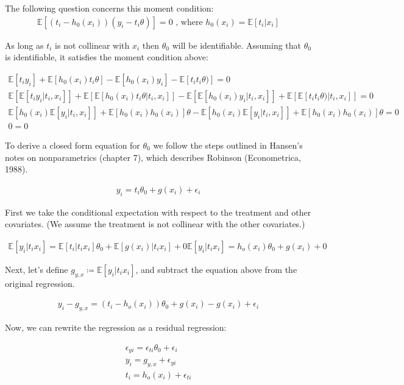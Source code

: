\documentclass[12pt]{article}
\newcommand{\E}{\mathbb{E}}
\begin{document}
The following question concerns this moment condition:
\begin{gather*}
\E[(t_i - h_0(x_i))(y_i - t_i\theta)] = 0 \text{  , where }  h_0(x_i) = \E[t_i | x_i]
\end{gather*}

As long as $t_i$ is not collinear with $x_i$ then $\theta_0$ will be identifiable. Assuming that $\theta_0$ is identifiable, it satisfies the moment condition above:

\begin{gather*}
\E[t_i y_i] + \E[h_0(x_i)t_i\theta] - \E[h_0(x_i)y_i] - \E[t_i t_i\theta)] = 0 \\
\E[\E[t_i y_i |t_i, x_i]] + \E[\E[h_0(x_i)t_i\theta|t_i, x_i]]  - \E[\E[h_0(x_i)y_i |t_i, x_i]]  + \E[\E[t_it_i\theta) |t_i, x_i]]  = 0 \\
\E[h_0(x_i) \E[y_i |t_i, x_i]] + \E[h_0(x_i)h_0(x_i)]\theta  - \E[h_0(x_i) \E[y_i |t_i, x_i]]  + \E[h_0(x_i)h_0(x_i)]\theta   = 0 \\
0=0
\end{gather*}

To derive a closed form equation for $\theta_0$ we follow the steps outlined in Hansen's notes on nonparametrics (chapter 7), which describes Robinson (Econometrica, 1988).

\begin{gather*}
y_i = t_i\theta_0 + g(x_i) + \epsilon_i
\end{gather*}

First we take the conditional expectation with respect to the treatment and other covariates. (We assume the treatment is not collinear with the other covariates.)

\begin{gather*}
\E[y_i|t_i x_i] = \E[t_i|t_i x_i]\theta_0 + \E[g(x_i)|t_i x_i]  + 0
\E[y_i|t_i x_i] = h_o(x_i)\theta_0 + g(x_i) + 0
\end{gather*}

Next, let's define $ g_{y,x}  \coloneqq \E[y_i|t_i x_i]$, and subtract the equation above from the original regression.


\begin{gather*}
y_i - g_{y,x} = (t_i -  h_o(x_i))\theta_0 + g(x_i) - g(x_i) + \epsilon_i
\end{gather*}

Now, we can rewrite the regression as a residual regression:

\begin{gather*}
\epsilon_{yi} =  \epsilon_{ti}\theta_0 + \epsilon_i\\
y_i = g_{y,x} + \epsilon_{yi}\\
t_i =  h_o(x_i) + \epsilon_{ti}
\end{gather*}
\end{document}
